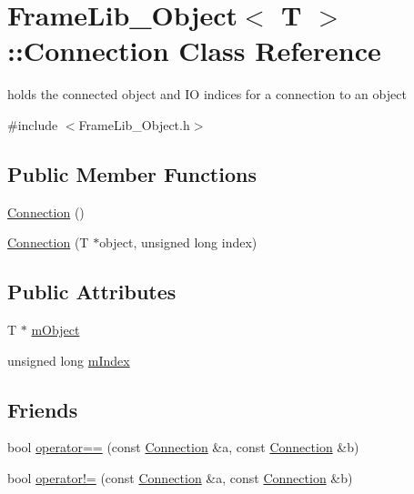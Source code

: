 \hypertarget{struct_frame_lib___object_1_1_connection}{}\section{Frame\+Lib\+\_\+\+Object$<$ T $>$\+:\+:Connection Class Reference}
\label{struct_frame_lib___object_1_1_connection}


holds the connected object and IO indices for a connection to an object  




{\ttfamily \#include $<$Frame\+Lib\+\_\+\+Object.\+h$>$}

\subsection*{Public Member Functions}
\begin{DoxyCompactItemize}
\item 
\hyperlink{struct_frame_lib___object_1_1_connection_ab0e9711193a05fc2f5db06354d7a888f}{Connection} ()
\item 
\hyperlink{struct_frame_lib___object_1_1_connection_adcdad42d336b5d8861c63a6389fa4695}{Connection} (T $\ast$object, unsigned long index)
\end{DoxyCompactItemize}
\subsection*{Public Attributes}
\begin{DoxyCompactItemize}
\item 
T $\ast$ \hyperlink{struct_frame_lib___object_1_1_connection_aef813814b61e0607303a3aa69d896e01}{m\+Object}
\item 
unsigned long \hyperlink{struct_frame_lib___object_1_1_connection_af1a05bc9dc0a0cee180992dcd2638189}{m\+Index}
\end{DoxyCompactItemize}
\subsection*{Friends}
\begin{DoxyCompactItemize}
\item 
bool \hyperlink{struct_frame_lib___object_1_1_connection_af5196f28c688a02175f42abc6209c254}{operator==} (const \hyperlink{struct_frame_lib___object_1_1_connection}{Connection} \&a, const \hyperlink{struct_frame_lib___object_1_1_connection}{Connection} \&b)
\item 
bool \hyperlink{struct_frame_lib___object_1_1_connection_acedc598366e9ba4c003fb529cecf84ad}{operator!=} (const \hyperlink{struct_frame_lib___object_1_1_connection}{Connection} \&a, const \hyperlink{struct_frame_lib___object_1_1_connection}{Connection} \&b)
\end{DoxyCompactItemize}


